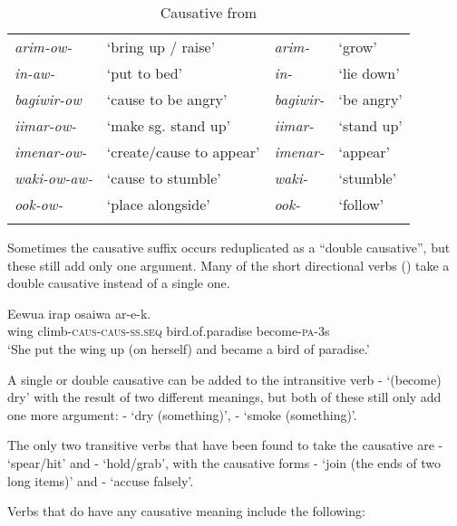 \begin{table}
\caption{Causative from} 
\begin{tabular}{>{\itshape}ll>{\itshape}ll}
\mytoprule
arim-ow- &`bring up / raise' &arim- &`grow'\\
in-aw- &`put to bed' &in- &`lie down'\\
bagiwir-ow &`cause to be angry' &bagiwir- &`be angry'\\
iimar-ow- &`make sg. stand up' &iimar- &`stand up'\\
imenar-ow- &`create/cause to appear' &imenar- &`appear'\\
waki-ow-aw- &`cause to stumble' &waki- &`stumble'\\
ook-ow- &`place alongside' &ook- &`follow'\\
\mybottomrule
\end{tabular}
\end{table}

Sometimes the causative suffix occurs reduplicated as a ``double causative'', but these still add only one argument. Many of the short directional verbs () take a double causative instead of a single one. 

\ea%
\label{ex:3:x205}
\gll Eewua irap osaiwa ar-e-k. \\
wing climb-\textsc{caus}-\textsc{caus}-\textsc{ss}.\textsc{seq} bird.of.paradise become-\textsc{pa}-3s \\
\glt`She put the wing up (on herself) and became a bird of paradise.'
\z

A single or double causative can be added to the intransitive verb - `(become) dry' with the result of two different meanings, but both of these still only add one more argument: - `dry (something)', - `smoke (something)'.

The only two transitive verbs that have been found to take the causative are - `spear/hit' and - `hold/grab', with the causative forms - `join (the ends of two long items)' and - `accuse falsely'. 

Verbs that do  have any causative meaning include the following:

